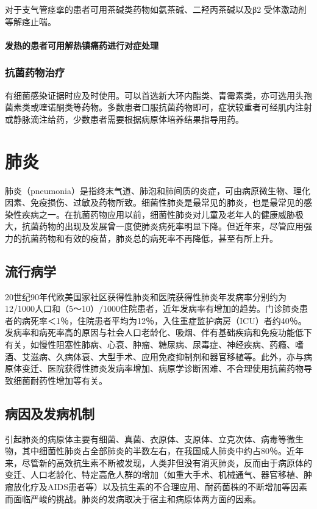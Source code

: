 对于支气管痉挛的患者可用茶碱类药物如氨茶碱、二羟丙茶碱以及β{2}
受体激动剂等解痉止喘。
\paragraph{发热的患者可用解热镇痛药进行对症处理}

\subsubsection{抗菌药物治疗}

有细菌感染证据时应及时使用。可以首选新大环内酯类、青霉素类，亦可选用头孢菌素类或喹诺酮类等药物。多数患者口服抗菌药物即可，症状较重者可经肌内注射或静脉滴注给药，少数患者需要根据病原体培养结果指导用药。

\section{肺炎}

肺炎（pneumonia）是指终末气道、肺泡和肺间质的炎症，可由病原微生物、理化因素、免疫损伤、过敏及药物所致。细菌性肺炎是最常见的肺炎，也是最常见的感染性疾病之一。在抗菌药物应用以前，细菌性肺炎对儿童及老年人的健康威胁极大，抗菌药物的出现及发展曾一度使肺炎病死率明显下降。但近年来，尽管应用强力的抗菌药物和有效的疫苗，肺炎总的病死率不再降低，甚至有所上升。

\subsection{流行病学}

20世纪90年代欧美国家社区获得性肺炎和医院获得性肺炎年发病率分别约为12/1000人口和（5～10）/1000住院患者，近年发病率有增加的趋势。门诊肺炎患者的病死率＜1％，住院患者平均为12％，入住重症监护病房（ICU）者约40％。发病率和病死率高的原因与社会人口老龄化、吸烟、伴有基础疾病和免疫功能低下有关，如慢性阻塞性肺病、心衰、肿瘤、糖尿病、尿毒症、神经疾病、药瘾、嗜酒、艾滋病、久病体衰、大型手术、应用免疫抑制剂和器官移植等。此外，亦与病原体变迁、医院获得性肺炎发病率增加、病原学诊断困难、不合理使用抗菌药物导致细菌耐药性增加等有关。

\subsection{病因及发病机制}

引起肺炎的病原体主要有细菌、真菌、衣原体、支原体、立克次体、病毒等微生物，其中细菌性肺炎占全部肺炎的半数左右，在我国成人肺炎中约占80％。近年来，尽管新的高效抗生素不断被发现，人类非但没有消灭肺炎，反而由于病原体的变迁、人口老龄化、特定高危人群的增加（如重大手术、机械通气、器官移植、肿瘤放化疗及AIDS患者等）以及抗生素的不合理应用、耐药菌株的不断增加等因素而面临严峻的挑战。肺炎的发病取决于宿主和病原体两方面的因素。

